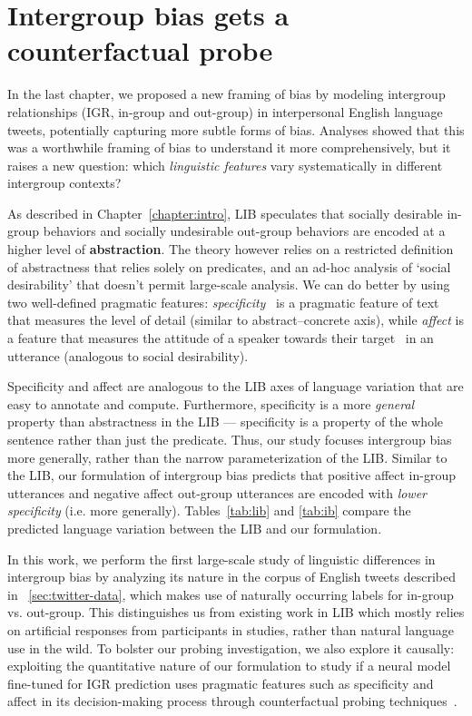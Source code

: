 \chapter{Intergroup bias gets a counterfactual probe}
\label{chapter:probing}

In the last chapter, we proposed a new framing of bias by modeling intergroup relationships (IGR, in-group and out-group) in interpersonal English language tweets, potentially capturing more subtle forms of bias. Analyses showed that this was a worthwhile framing of bias to understand it more comprehensively, but it raises a new question: which \emph{linguistic features} vary systematically in different intergroup contexts?

As described in Chapter~\ref{chapter:intro}, LIB speculates that socially desirable in-group behaviors and socially undesirable out-group behaviors are encoded at a higher level of \textbf{abstraction}. The theory however relies on a restricted definition of abstractness that relies solely on predicates, and an ad-hoc analysis of `social desirability' that doesn't permit large-scale analysis. We can do better by using two well-defined pragmatic features: \emph{specificity}~\citep{li_discourse_2017} is a pragmatic feature of text that measures the level of detail (similar to abstract--concrete axis), while \emph{affect} is a feature that measures the attitude of a speaker towards their target~\citep{sheng-etal-2019-woman} in an utterance (analogous to social desirability).

Specificity and affect are analogous to the LIB axes of language variation that are easy to annotate and compute. Furthermore, specificity is a more \emph{general} property than abstractness in the LIB --- specificity is a property of the whole sentence rather than just the predicate. Thus, our study focuses intergroup bias more generally, rather than the narrow parameterization of the LIB. Similar to the LIB, our formulation of intergroup bias predicts that positive affect in-group utterances and negative affect out-group utterances are encoded with \emph{lower specificity} (i.e. more generally). Tables~\ref{tab:lib} and \ref{tab:ib} compare the predicted language variation between the LIB and our formulation. 

In this work, we perform the first large-scale study of linguistic differences in intergroup bias by analyzing its nature in the corpus of English tweets described in \textsection~\ref{sec:twitter-data}, which makes use of naturally occurring labels for in-group vs. out-group. This distinguishes us from existing work in LIB which mostly relies on artificial responses from participants in studies, rather than natural language use in the wild. To bolster our probing investigation, we also explore it causally: exploiting the quantitative nature of our formulation to study if a neural model fine-tuned for IGR prediction uses pragmatic features such as specificity and affect in its decision-making process through counterfactual probing techniques~\citep{ravfogel-etal-2021-counterfactual}.

